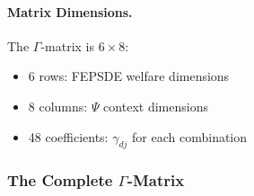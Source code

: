 \paragraph{Matrix Dimensions.}
The $\Gamma$-matrix is $6 \times 8$:
\begin{itemize}
\item 6 rows: FEPSDE welfare dimensions
\item 8 columns: $\Psi$ context dimensions
\item 48 coefficients: $\gamma_{dj}$ for each combination
\end{itemize}

\subsubsection{The Complete $\Gamma$-Matrix}

